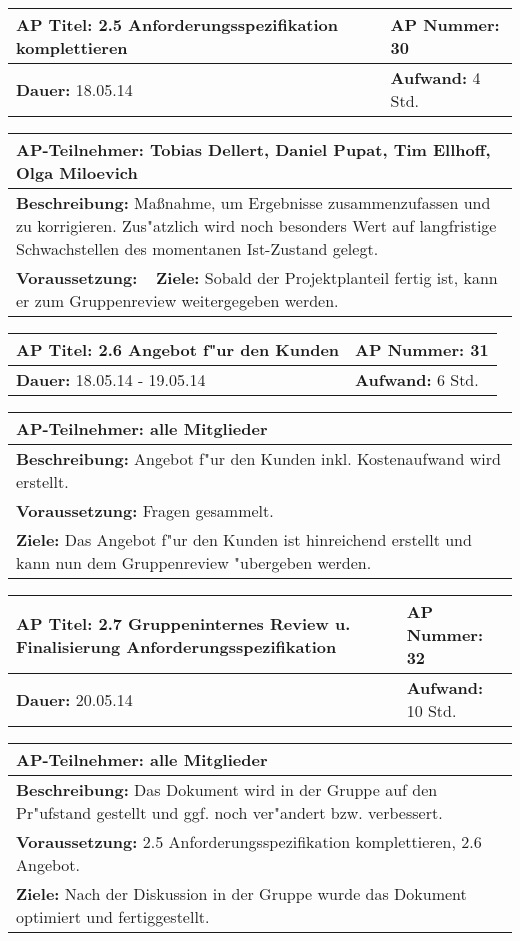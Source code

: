 \begin{tabular}{|p{7.43cm}|p{7.43cm}|}
\hline
\textbf{AP Titel: }2.5 Anforderungsspezifikation komplettieren& \textbf{AP Nummer: }30\\ 
\hline
\textbf{Dauer: }18.05.14& \textbf{Aufwand: } 4 Std.\\
\hline
\end{tabular}
\begin{tabular}{|p{15.3cm}|}
\hline
\textbf{AP-Teilnehmer: }Tobias Dellert, Daniel Pupat, Tim Ellhoff, Olga Miloevich\\
\hline
\textbf{Beschreibung: }Maßnahme, um Ergebnisse zusammenzufassen und zu korrigieren. Zus"atzlich wird noch besonders Wert auf langfristige Schwachstellen des momentanen Ist-Zustand gelegt.\\
\hline
\textbf{Voraussetzung: }\
\hline 
\textbf{Ziele: }Sobald der Projektplanteil fertig ist, kann er zum Gruppenreview weitergegeben werden.\\
\hline 
\end{tabular}

\begin{tabular}{|p{7.43cm}|p{7.43cm}|}
\hline
\textbf{AP Titel: }2.6 Angebot f"ur den Kunden& \textbf{AP Nummer: }31\\ 
\hline
\textbf{Dauer: }18.05.14 - 19.05.14& \textbf{Aufwand: } 6 Std.\\
\hline
\end{tabular}
\begin{tabular}{|p{15.3cm}|}
\hline
\textbf{AP-Teilnehmer: }alle Mitglieder\\
\hline
\textbf{Beschreibung: }Angebot f"ur den Kunden inkl. Kostenaufwand wird erstellt.\\
\hline
\textbf{Voraussetzung: }Fragen gesammelt.\\
\hline 
\textbf{Ziele: }Das Angebot f"ur den Kunden ist hinreichend erstellt und kann nun dem Gruppenreview "ubergeben werden.\\
\hline 
\end{tabular}

\begin{tabular}{|p{7.43cm}|p{7.43cm}|}
\hline
\textbf{AP Titel: }2.7 Gruppeninternes Review u. Finalisierung Anforderungsspezifikation& \textbf{AP Nummer: }32\\ 
\hline
\textbf{Dauer: }20.05.14& \textbf{Aufwand: } 10 Std.\\
\hline
\end{tabular}
\begin{tabular}{|p{15.3cm}|}
\hline
\textbf{AP-Teilnehmer: }alle Mitglieder\\
\hline
\textbf{Beschreibung: }Das Dokument wird in der Gruppe auf den Pr"ufstand gestellt und ggf. noch ver"andert bzw. verbessert.\\
\hline
\textbf{Voraussetzung: }2.5 Anforderungsspezifikation komplettieren, 2.6 Angebot.\\
\hline 
\textbf{Ziele: }Nach der Diskussion in der Gruppe wurde das Dokument optimiert und fertiggestellt.\\
\hline 
\end{tabular}
